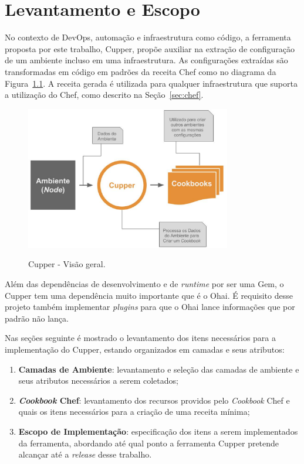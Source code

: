 \newpage\null\thispagestyle{empty}\newpage
\chapter{Levantamento e Escopo}
\label{chap:lev_es}

No contexto de DevOps, automação e infraestrutura como código, a ferramenta
proposta por este trabalho, Cupper, propõe auxiliar na extração de configuração
de um ambiente incluso em uma infraestrutura. As configurações extraídas são
transformadas em código em padrões da receita Chef como 
no diagrama da Figura~\ref{fig:cupper_geral}. A
receita gerada é utilizada para qualquer infraestrutura que suporta a
utilização do Chef, como descrito na Seção~\ref{sec:chef}.

\begin{figure}[]
  \centering
  \includegraphics[width=0.8\textwidth]{figuras/cupper_geral.eps}
  \label{fig:cupper_geral}
  \caption{Cupper - Visão geral.}
\end{figure}

Além das dependências de desenvolvimento e de \textit{runtime} por ser uma Gem,
o Cupper tem uma dependência muito
importante que é o Ohai. É requisito desse projeto também implementar
\textit{plugins} para que o Ohai lance informações que por padrão 
não lança.

Nas seções seguinte é mostrado o levantamento dos itens necessários para
a implementação do Cupper, estando organizados em camadas e seus atributos:

\begin{enumerate}
  \item \textbf{Camadas de Ambiente}: levantamento e seleção das camadas de ambiente
    e seus atributos necessários a serem coletados;
  \item \textbf{\textit{Cookbook} Chef}: levantamento dos recursos providos pelo \textit{Cookbook} Chef e quais os
    itens necessários para a criação de uma receita mínima;
  \item \textbf{Escopo de Implementação}: especificação dos itens a serem implementados
    da ferramenta, abordando até qual ponto a ferramenta Cupper pretende alcançar
    até a \textit{release} desse trabalho.
\end{enumerate}






